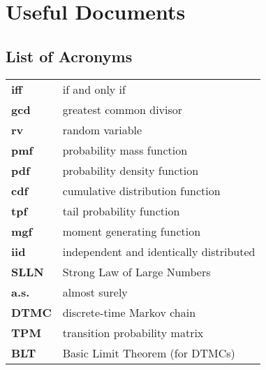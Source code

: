 \appendix
\chapter{Useful Documents}
\section{List of Acronyms}
\begin{tabular}{>{\bfseries}ll}
    iff  & if and only if                          \\
    gcd  & greatest common divisor                 \\
    rv   & random variable                         \\
    pmf  & probability mass function               \\
    pdf  & probability density function            \\
    cdf  & cumulative distribution function        \\
    tpf  & tail probability function               \\
    mgf  & moment generating function              \\
    iid  & independent and identically distributed \\
    SLLN & Strong Law of Large Numbers             \\
    a.s. & almost surely                           \\
    DTMC & discrete-time Markov chain              \\
    TPM  & transition probability matrix           \\
    BLT  & Basic Limit Theorem (for DTMCs)
\end{tabular}
\newpage
